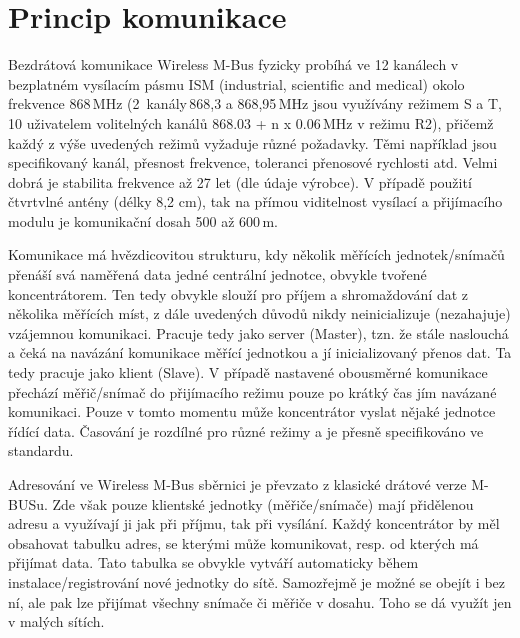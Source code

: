 
\section{Princip komunikace}

Bezdrátová komunikace Wireless M-Bus fyzicky probíhá ve 12 kanálech v bezplatném vysílacím pásmu ISM (industrial, scientific and medical) okolo frekvence 868\,MHz (2~kanály\,868,3 a 868,95\,MHz jsou využívány režimem S a T, 10 uživatelem volitelných kanálů 868.03 + n x 0.06\,MHz v režimu R2), přičemž každý z výše uvedených režimů vyžaduje různé požadavky. Těmi například jsou specifikovaný kanál, přesnost frekvence, toleranci přenosové rychlosti atd. Velmi dobrá je stabilita frekvence až 27 let (dle údaje výrobce). V případě použití čtvrtvlné antény (délky 8,2 cm), tak na přímou viditelnost vysílací a přijímacího modulu je komunikační dosah 500 až 600\,m.

Komunikace má hvězdicovitou strukturu, kdy několik měřících jednotek/snímačů přenáší svá naměřená data jedné centrální jednotce, obvykle tvořené koncentrátorem. Ten tedy obvykle slouží pro příjem a shromaždování dat z několika měřících míst, z dále uvedených důvodů nikdy neinicializuje (nezahajuje) vzájemnou komunikaci. Pracuje tedy jako server (Master), tzn. že stále naslouchá a čeká na navázání komunikace měřící jednotkou a jí inicializovaný přenos dat. Ta tedy pracuje jako klient (Slave). V případě nastavené obousměrné komunikace přechází měřič/snímač do přijímacího režimu pouze po krátký čas jím navázané komunikaci. Pouze v tomto momentu může koncentrátor vyslat nějaké jednotce řídící data. Časování je rozdílné pro různé režimy a je přesně specifikováno ve standardu.

Adresování ve Wireless M-Bus sběrnici je převzato z klasické drátové verze M-BUSu. Zde však pouze klientské jednotky (měřiče/snímače) mají přidělenou adresu a využívají ji jak při příjmu, tak při vysílání. Každý koncentrátor by měl obsahovat tabulku adres, se kterými může komunikovat, resp. od kterých má přijímat data. Tato tabulka se obvykle vytváří automaticky během instalace/registrování nové jednotky do sítě. Samozřejmě je možné se obejít i bez ní, ale pak lze přijímat všechny snímače či měřiče v dosahu. Toho se dá využít jen v malých sítích. 


